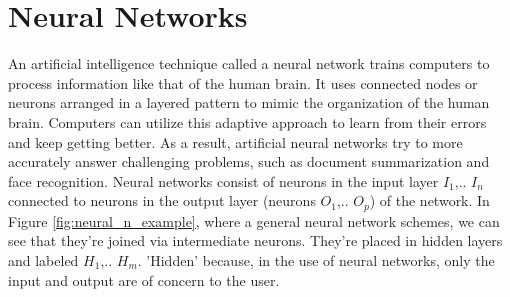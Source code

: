 \section{Neural Networks}
An artificial intelligence technique called a neural network trains computers to process information like that of the human brain. It uses connected nodes or neurons arranged in a layered pattern to mimic the organization of the human brain. Computers can utilize this adaptive approach to learn from their errors and keep getting better. As a result, artificial neural networks try to more accurately answer challenging problems, such as document summarization and face recognition.
\newline Neural networks consist of neurons in the input layer $I_1$,.. $I_n$ connected to neurons in the output layer (neurons $O_1$,.. $O_p$) of the network. In Figure \ref{fig:neural_n_example}, where a general neural network schemes, we can see that they're joined via intermediate neurons. They're placed in hidden layers and labeled $H_1$,.. $H_m$. 'Hidden' because, in the use of neural networks, only the input and output are of concern to the user. 



